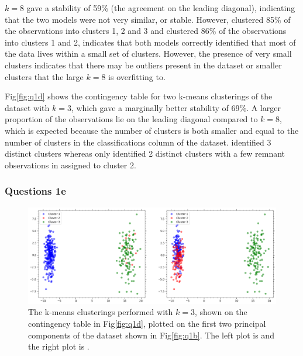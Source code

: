     $k=8$ gave a stability of 59\% (the agreement on the leading diagonal), indicating that the two models were
    not very similar, or stable.
    However,  clustered 85\% of the observations into clusters 1, 2 and 3 and 
    clustered 86\% of the observations into clusters 1 and 2, indicates that both models correctly identified that most of the data
    lives within a small set of clusters.
    However, the presence of very small clusters indicates that there may be outliers present in the dataset or smaller
    clusters that the large $k=8$ is overfitting to.

    Fig\eqref{fig:q1d} shows the contingency table for two k-means clusterings of the dataset with $k=3$, which gave a
    marginally better stability of 69\%.
    A larger proportion of the observations lie on the leading diagonal compared to $k=8$, which is expected because
    the number of clusters is both smaller and equal to the number of clusters in the classifications column of the
    dataset.
     identified 3 distinct clusters whereas  only identified 2 distinct
    clusters with a few remnant observations in assigned to cluster 2.

\subsubsection{Questions 1e}\label{subsubsec:q1e}
    \begin{figure}[htb]
    \centering
    \includegraphics[width=1\textwidth]{./figures/q1e}
    \caption{The k-means clusterings performed with $k=3$, shown on the contingency table in Fig\eqref{fig:q1d}, plotted
        on the first two principal components of the dataset shown in Fig\eqref{fig:q1b}. The left plot is
         and the right plot is .}
    \label{fig:q1e}
    \end{figure}

